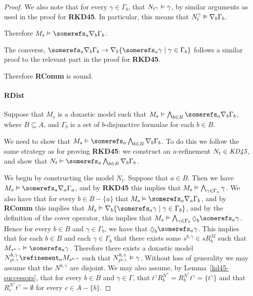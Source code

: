 \begin{proof}
We also note that for every $\gamma \in \Gamma_b$, that $N_{t^\gamma} \vDash
\gamma$, by similar arguments as used in the proof for {\bf RKD45}. In
particular, this means that $N^\gamma_t \vDash \nabla_b \Gamma_b$.

Therefore $M_s \entails \somerefs_a \covers_b \Gamma_b$.

The converse, $\somerefs_a \covers_b \Gamma_b \implies \covers_b \{\somerefs_a
\gamma \mid \gamma \in \Gamma_b\}$ follows a similar proof to the relevant part in
the proof for {\bf RKD45}.

Therefore {\bf RComm} is sound.

\paragraph{RDist} 
Suppose that $M_s$ is a doxastic model such that $M_s \entails \bigwedge_{b \in
B} \somerefs_a \covers_b \Gamma_b$, where $B \subseteq A$, and $\Gamma_b$ is a
set of $b$-disjunctive formulae for each $b \in B$.

We need to show that $M_s \entails \somerefs_a \bigwedge_{b \in B} \covers_b
\Gamma_b$. To do this we follow the same strategy as for proving {\bf RKD45}: we
construct an $a$-refinement $N_t \in \textit{KD45}$, and show that $N_t \entails
\somerefs_a \bigwedge_{b \in B} \covers_b \Gamma_b$.

We begin by constructing the model $N_t$. Suppose that $a \in B$. Then we have
$M_s \entails \somerefs_a \covers_a \Gamma_a$, and by {\bf RKD45} this implies that
$M_s \vDash \bigwedge_{\gamma \in \Gamma_a} \gamma$. We also have that for
every $b \in B - \{a\}$ that $M_s \entails \somerefs_a \covers_a \Gamma_b$, and
by {\bf RComm} this implies that $M_s \entails \covers_b \{\somerefs_a \gamma
\mid \gamma \in \Gamma_b\}$, and by the definition of the cover operator, this
implies that $M_s \entails \bigwedge_{\gamma \in \Gamma_b} \suspects_b
\somerefs_a \gamma$. Hence for every $b \in B$ and $\gamma \in \Gamma_b$, we
have that $\suspects_b \somerefs_a \gamma$. This implies that for each $b \in B$
and each $\gamma \in \Gamma_b$ that there exists some $s^{b,\gamma} \in sR^M_b$ such
that $M_{s^{a,\gamma}} \entails \somerefs_a \gamma$. Therefore there exists a
doxastic model $N^{b,\gamma}_{t^{b,\gamma}} \refinement_a M_{s^{a,\gamma}}$ such
that $N^{b,\gamma}_{t^{b,\gamma}} \vDash \gamma$. Without loss of generality
we may assume that the $N^{b,\gamma}$ are disjoint. We may also assume, by
Lemma~\ref{kd45-successors}, that for every $b \in B$ and $\gamma \in \Gamma$,
that $t^\gamma R^{N^\gamma}_b = R^{N^\gamma}_b t^\gamma = \{t^\gamma\}$ and that
$R^{N^\gamma}_c t^\gamma = \emptyset$ for every $c \in A - \{b\}$.


\end{proof}
